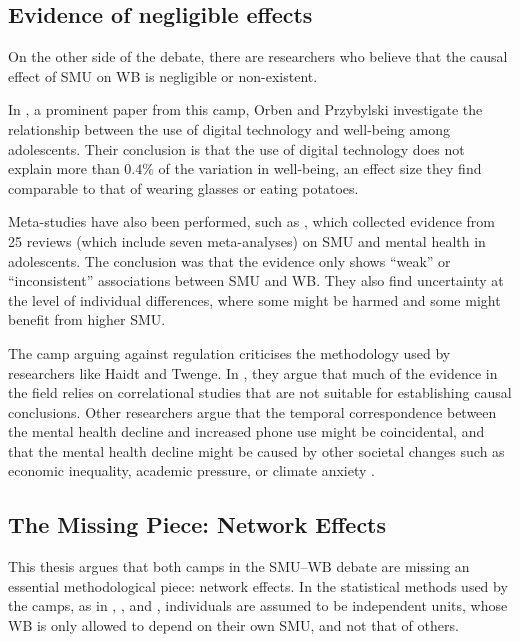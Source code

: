 \subsection{Evidence of negligible effects}

On the other side of the debate, there are researchers who believe that the causal effect of SMU on WB is negligible or non-existent.

In \textcite[pp.~173, 178]{Orben2019}, a prominent paper from this camp, Orben and Przybylski investigate the relationship between the use of digital technology and well-being among adolescents. Their conclusion is that the use of digital technology does not explain more than $0.4\%$ of the variation in well-being, an effect size they find comparable to that of wearing glasses or eating potatoes.

Meta-studies have also been performed, such as \textcite[p.~58]{Valkenburg2022}, which collected evidence from 25 reviews (which include seven meta-analyses) on SMU and mental health in adolescents. The conclusion was that the evidence only shows ``weak'' or ``inconsistent'' associations between SMU and WB\@. They also find uncertainty at the level of individual differences, where some might be harmed and some might benefit from higher SMU\@.

The camp arguing against regulation criticises the methodology used by researchers like Haidt and Twenge. In \textcite{Odgers2020}, they argue that much of the evidence in the field relies on correlational studies that are not suitable for establishing causal conclusions. Other researchers argue that the temporal correspondence between the mental health decline and increased phone use might be coincidental, and that the mental health decline might be caused by other societal changes such as economic inequality, academic pressure, or climate anxiety \parencite{McGorry2025}.

\subsection{The Missing Piece: Network Effects}

This thesis argues that both camps in the SMU--WB debate are missing an essential methodological piece: network effects. In the statistical methods used by the camps, as in \textcite{Twenge2018}, \textcite{Orben2019}, and \textcite[p.~6]{Allcott2019}, individuals are assumed to be independent units, whose WB is only allowed to depend on their own SMU, and not that of others.

